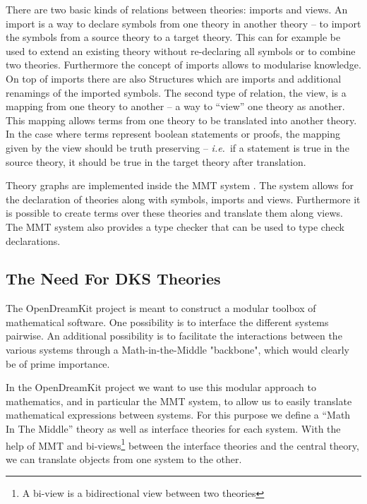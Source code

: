 \documentclass{deliverablereport}
\begin{document}
There are two basic kinds of relations between theories: imports and views. An import is a way to declare symbols from one theory in another theory -- to import the symbols from a source theory to a target theory. This can for example be used to extend an existing theory without re-declaring all symbols or to combine two theories. Furthermore the concept of imports allows to modularise knowledge. On top of imports there are also Structures which are imports and additional renamings of the imported symbols. The second type of relation, the view, is a mapping from one theory to another -- a way to ``view'' one theory as another. This mapping allows terms from one theory to be translated into another theory. In the case where terms represent boolean statements or proofs, the mapping given by the view should be truth preserving -- \emph{i.e.}~if a statement is true in the source theory, it should be true in the target theory after translation.

Theory graphs are implemented inside the MMT system \cite{RabKoh:WSMSML13}. The system allows for the declaration of theories along with symbols, imports and views. Furthermore it is possible to create terms over these theories and translate them along views. The MMT system also provides a type checker that can be used to type check declarations. 

\subsection{The Need For DKS Theories}
The OpenDreamKit project is meant to construct a modular toolbox of mathematical software. One possibility is to interface the different systems pairwise. An additional possibility is to facilitate the interactions between the various systems through a Math-in-the-Middle "backbone", which would clearly be of prime importance.

In the OpenDreamKit project we want to use this modular approach to mathematics, and in particular the MMT system, to allow us to easily translate mathematical expressions between systems. For this purpose we define a ``Math In The Middle'' theory as well as interface theories for each system. With the help of MMT and bi-views\footnote{A bi-view is a bidirectional view between two theories} between the interface theories and the central theory, we can translate objects from one system to the other. 
\end{document}
